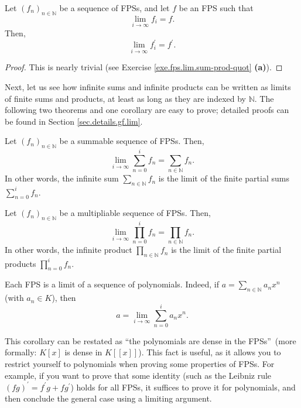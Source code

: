 \begin{proposition}
\label{prop.fps.lim.deriv-lim}Let $\left(  f_{n}\right)  _{n\in\mathbb{N}}$ be
a sequence of FPSs, and let $f$ be an FPS such that%
\[
\lim\limits_{i\rightarrow\infty}f_{i}=f.
\]
Then,%
\[
\lim\limits_{i\rightarrow\infty}f_{i}^{\prime}=f^{\prime}.
\]

\end{proposition}

\begin{proof}
This is nearly trivial (see Exercise \ref{exe.fps.lim.sum-prod-quot}
\textbf{(a)}).
\end{proof}

Next, let us see how infinite sums and infinite products can be written as
limits of finite sums and products, at least as long as they are indexed by
$\mathbb{N}$. The following two theorems and one corollary are easy to prove;
detailed proofs can be found in Section \ref{sec.details.gf.lim}.

\begin{theorem}
\label{thm.fps.lim.sum-lim}Let $\left(  f_{n}\right)  _{n\in\mathbb{N}}$ be a
summable sequence of FPSs. Then,%
\[
\lim\limits_{i\rightarrow\infty}\sum_{n=0}^{i}f_{n}=\sum_{n\in\mathbb{N}}%
f_{n}.
\]
In other words, the infinite sum $\sum_{n\in\mathbb{N}}f_{n}$ is the limit of
the finite partial sums $\sum_{n=0}^{i}f_{n}$.
\end{theorem}

\begin{theorem}
\label{thm.fps.lim.prod-lim}Let $\left(  f_{n}\right)  _{n\in\mathbb{N}}$ be a
multipliable sequence of FPSs. Then,%
\[
\lim\limits_{i\rightarrow\infty}\prod_{n=0}^{i}f_{n}=\prod_{n\in\mathbb{N}%
}f_{n}.
\]
In other words, the infinite product $\prod_{n\in\mathbb{N}}f_{n}$ is the
limit of the finite partial products $\prod_{n=0}^{i}f_{n}$.
\end{theorem}

\begin{corollary}
\label{cor.fps.lim.fps-as-pol}Each FPS is a limit of a sequence of
polynomials. Indeed, if $a=\sum_{n\in\mathbb{N}}a_{n}x^{n}$ (with $a_{n}\in
K$), then%
\[
a=\lim\limits_{i\rightarrow\infty}\sum_{n=0}^{i}a_{n}x^{n}.
\]

\end{corollary}

This corollary can be restated as \textquotedblleft the polynomials are dense
in the FPSs\textquotedblright\ (more formally: $K\left[  x\right]  $ is dense
in $K\left[  \left[  x\right]  \right]  $). This fact is useful, as it allows
you to restrict yourself to polynomials when proving some properties of FPSs.
For example, if you want to prove that some identity (such as the Leibniz rule
$\left(  fg\right)  ^{\prime}=f^{\prime}g+fg^{\prime}$) holds for all FPSs, it
suffices to prove it for polynomials, and then conclude the general case using
a limiting argument.

